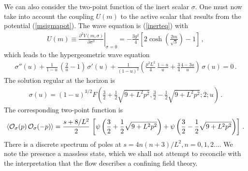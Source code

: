 \documentclass[a4paper,12pt]{article}
\begin{document}
We can also consider the two-point function of the inert
scalar $\sigma$.  One must now take into account the coupling $U(m)$
to the active scalar that results from the potential (\ref{msigmapot}).
The wave equation is (\ref{inerteq}) with
\begin{eqnarray}
U(m) \equiv \left. \frac{\partial^2 V(m,\sigma)}{\partial \sigma^2}
\right|_{\sigma = 0} = - \frac{3 g^2}{4} \left[ 2 \cosh
\left(\frac{2m}{\sqrt{3}} \right) -1 \right] \,,
\end{eqnarray}
which leads to the hypergeometric wave equation
\begin{eqnarray}
\sigma''(u) + \frac{1}{1-u} \, \left( \frac{2}{u} -1 \right) \, \sigma'(u)
+ \frac{1}{(1-u)^2} \left( \frac{p^2 L^2}{4} \, \frac{1-u}{u}
+ \frac{3}{4} \frac{4-3u}{u} \right)
 \, \sigma(u) = 0 \,.
\end{eqnarray}
The solution regular at the horizon is
\begin{eqnarray}
\sigma(u) = (1-u)^{3/2} F \left( \frac{3}{2} + \frac{1}{2} \sqrt{9 +
L^2 p^2}, \frac{3}{2} - \frac{1}{2} \sqrt{9 + L^2 p^2};2;u \right) \,.
\end{eqnarray}
The corresponding two-point function is 
\begin{eqnarray}
\label{sigmacorr}
\langle{\cal O}_{\sigma}(p) \, {\cal O}_{\sigma}(-p)\rangle =
\frac{s+8/L^2}{2} \, \left[\psi \left( \frac{3}{2} + \frac{1}{2}
\sqrt{9 + L^2 p^2} \right) + \psi \left(\frac{3}{2} - \frac{1}{2}
\sqrt{9 + L^2 p^2} \right) \right] \,.
\end{eqnarray}
There is a discrete spectrum of poles at $s=4n(n+3)/L^2, n=0,1,2...$. We
note the presence a massless state, which we shall not attempt to reconcile
with the interpretation \cite{gppz}that the flow describes a confining
field theory.
\end{document}
